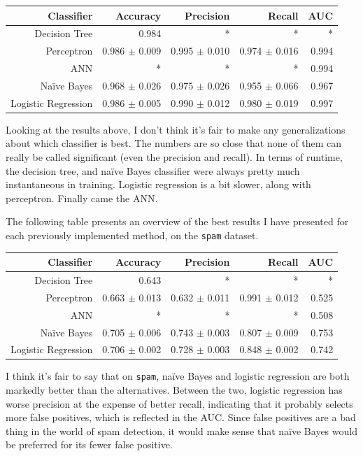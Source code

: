 \documentclass[fleqn]{homework}
\begin{document}
  \vspace{0.3cm}
  \begin{tabular}{rrrrr}
    \hline
    Classifier & Accuracy & Precision & Recall & AUC \\
    \hline
    Decision Tree & 0.984 & * & * & * \\
    Perceptron & 0.986 $\pm$ 0.009 & 0.995 $\pm$ 0.010 & 0.974 $\pm$ 0.016 & 0.994 \\
    ANN & * & * & * & 0.994 \\
    Na\"ive Bayes & 0.968 $\pm$ 0.026 & 0.975 $\pm$ 0.026 & 0.955 $\pm$ 0.066 & 0.967 \\
    Logistic Regression & 0.986 $\pm$ 0.005 & 0.990 $\pm$ 0.012 & 0.980 $\pm$ 0.019 & 0.997 \\
    \hline
  \end{tabular}
  \vspace{0.3cm}

  Looking at the results above, I don't think it's fair to make any
  generalizations about which classifier is best.  The numbers are so close that
  none of them can really be called significant (even the precision and recall).
  In terms of runtime, the decision tree, and na\"ive Bayes classifier were
  always pretty much instantaneous in training.  Logistic regression is a bit
  slower, along with perceptron.  Finally came the ANN.

  The following table presents an overview of the best results I have presented
  for each previously implemented method, on the \texttt{spam} dataset.

  \vspace{0.3cm}
  \begin{tabular}{rrrrr}
    \hline
    Classifier & Accuracy & Precision & Recall & AUC \\
    \hline
    Decision Tree & 0.643 & * & * & * \\
    Perceptron & 0.663 $\pm$ 0.013 & 0.632 $\pm$ 0.011 & 0.991 $\pm$ 0.012 & 0.525 \\
    ANN & * & * & * & 0.508 \\
    Na\"ive Bayes & 0.705 $\pm$ 0.006 & 0.743 $\pm$ 0.003 & 0.807 $\pm$ 0.009 & 0.753 \\
    Logistic Regression & 0.706 $\pm$ 0.002 & 0.728 $\pm$ 0.003 & 0.848 $\pm$ 0.002 & 0.742 \\
    \hline
  \end{tabular}
  \vspace{0.3cm}

  I think it's fair to say that on \texttt{spam}, na\"ive Bayes and logistic
  regression are both markedly better than the alternatives.  Between the two,
  logistic regression has worse precision at the expense of better recall,
  indicating that it probably selects more false positives, which is reflected
  in the AUC.  Since false positives are a bad thing in the world of spam
  detection, it would make sense that na\"ive Bayes would be preferred for its
  fewer false positive.
\end{document}
